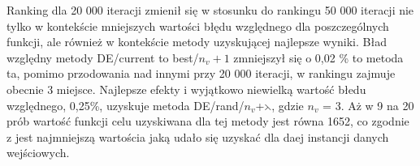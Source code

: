 \begin{itemize}
\begin{table}[h!]
\begin{center}
\caption{Ranking metod mutacji na podstawie średniej wartości błędu względnego funkcji celu, metoda rankingowa, 50 000 iteracji}
\label{ranking4}
\end{center}
\end{table}

Ranking dla 20 000 iteracji zmienił się w stosunku do rankingu 50 000 iteracji nie tylko w kontekście mniejszych wartości błędu względnego dla poszczególnych funkcji, ale również w kontekście metody uzyskującej najlepsze wyniki. Bład względny metody DE/current to best/$n_{v}+1$ zmniejszył się o 0,02 \% to metoda ta,  pomimo przodowania nad innymi przy 20 000 iteracji, w rankingu zajmuje obecnie 3 miejsce. Najlepsze efekty i wyjątkowo niewielką wartość błedu względnego,  0,25\%, uzyskuje metoda DE/rand/$n_{v}$+$\leftthreetimes$, gdzie $n_{v}$ = 3. Aż w 9 na 20 prób wartość funkcji celu uzyskiwana dla tej metody jest równa 1652, co zgodnie z \cite{qaplib} jest najmniejszą wartościa jaką udało się uzyskać dla daej instancji danych wejściowych.

\end{itemize}













